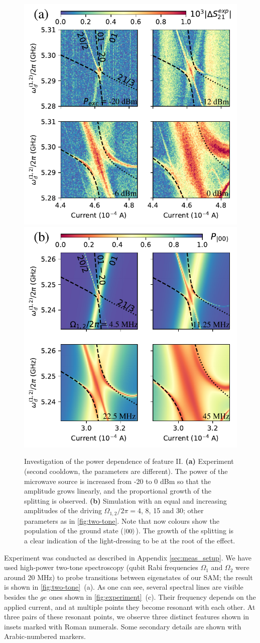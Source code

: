 \documentclass[%
 aip,
 amsmath,amssymb,
 reprint,%
]{revtex4-1}
\begin{document}
\begin{figure}
	\includegraphics[width=.49\linewidth]{powerscan}
	\includegraphics[width=.49\linewidth]{zoom2_picture}
	\caption{Investigation of the power dependence of feature II. \textbf{(a)} Experiment (second cooldown, the parameters are different). The power of the microwave source is increased from -20 to 0 dBm so that the amplitude grows linearly, and the proportional growth of the splitting is observed. \textbf{(b)} Simulation with an equal and increasing amplitudes of the driving $\Omega_{1,2}/2\pi=$4, 8, 15 and 30; other parameters as in \autoref{fig:two-tone}. Note that now colours show the population of the ground state ($\ket{00}$). The growth of the splitting is a clear indication of the light-dressing to be at the root of the effect.}
	\label{fig:zoom}
\end{figure}

Experiment was conducted as described in Appendix \ref{sec:meas_setup}. We have used high-power two-tone spectroscopy (qubit Rabi frequencies $\Omega_1$ and $\Omega_2$ were around 20 MHz) to probe transitions between eigenstates of our SAM; the result is shown in \autoref{fig:two-tone}~(a). As one can see, several spectral lines are visible besides the $ge$ ones shown in \autoref{fig:experiment}~(c). Their frequency depends on the applied current, and at multiple points they become resonant with each other. At three pairs of these resonant points, we observe three distinct features shown in insets marked with Roman numerals. Some secondary details are shown with Arabic-numbered markers.
\end{document}

